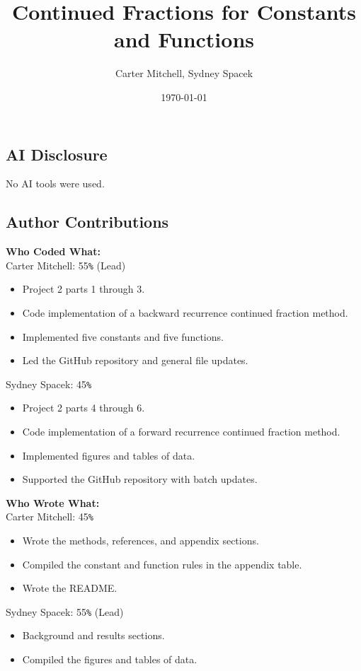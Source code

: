 \documentclass[12pt]{article}
\title{Continued Fractions for Constants and Functions}
\author{Carter Mitchell, Sydney Spacek}
\date{\today}
\begin{document}
\maketitle

\subsection*{AI Disclosure}
No AI tools were used.

\subsection*{Author Contributions}
\noindent
\textbf{Who Coded What:} \\
Carter Mitchell: 55\verb|%| (Lead)
\begin{itemize}
    \item Project 2 parts 1 through 3.
    \item Code implementation of a backward recurrence continued fraction method.
    \item Implemented five constants and five functions.
    \item Led the GitHub repository and general file updates.
\end{itemize}

\noindent
Sydney Spacek: 45\verb|%|
\begin{itemize}
    \item Project 2 parts 4 through 6.
    \item Code implementation of a forward recurrence continued fraction method.
    \item Implemented figures and tables of data.
    \item Supported the GitHub repository with batch updates.
\end{itemize}

\noindent
\textbf{Who Wrote What:} \\
Carter Mitchell: 45\verb|%|
\begin{itemize}
    \item Wrote the methods, references, and appendix sections.
    \item Compiled the constant and function rules in the appendix table.
    \item Wrote the README.
\end{itemize}

\noindent
Sydney Spacek: 55\verb|%| (Lead)
\begin{itemize}
    \item Background and results sections.
    \item Compiled the figures and tables of data.
\end{itemize}
\end{document}
